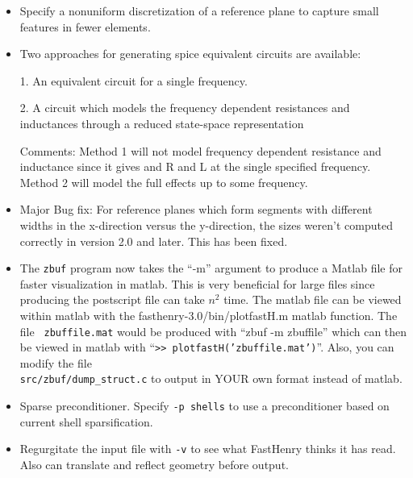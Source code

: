 \begin{itemize}

\item Specify a nonuniform discretization of a reference plane to
  capture small features in fewer elements.

\item
Two approaches for generating spice equivalent circuits are available:

1. An equivalent circuit for a single frequency.

2. A circuit which models the frequency
  dependent resistances and   inductances through a reduced state-space
  representation

 Comments:  Method 1 will not model frequency dependent resistance
 and inductance since it gives and R and L at the single specified
 frequency.  Method 2 will model the full effects up to some frequency.

\item Major Bug fix:
  For reference planes which form segments with different
  widths in the x-direction versus the y-direction, the sizes weren't
  computed correctly in version 2.0 and later.  This has been fixed.

\item
The {\tt zbuf} program now takes the ``-m'' argument to produce a
Matlab file for faster visualization in matlab.  This is very beneficial for
large files since producing the postscript file can take $n^2$ time.
The matlab file can be viewed within matlab with the
fasthenry-3.0/bin/plotfastH.m matlab function.  The file {\tt
  zbuffile.mat} would be produced with ``zbuf -m zbuffile'' which can
then be viewed in matlab with ``{\tt >> plotfastH('zbuffile.mat')}''.
Also, you can modify the file \\
{\tt src/zbuf/dump\_struct.c} to output in YOUR own
format instead of matlab.
\item Sparse preconditioner.  Specify {\tt -p shells} to use a
  preconditioner based on current shell sparsification.
\item Regurgitate the input file with {\tt -v} to see what FastHenry
  thinks it has read.  Also can translate and reflect geometry before output.
\end{itemize}




